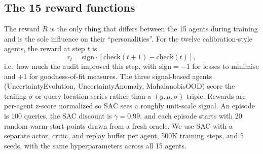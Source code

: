 \documentclass[11pt]{article}
\begin{document}
\subsection{The 15 reward functions}

The reward $R$ is the only thing that differs between the 15 agents during training and is the sole influence on their ``personalities''. For the twelve calibration-style agents, the reward at step $t$ is
\[
r_t = \text{sign} \cdot [\text{check}(t+1) - \text{check}(t)],
\]
i.e.\ how much the audit improved this step, with $\text{sign} = -1$ for losses to minimise and $+1$ for goodness-of-fit measures. The three signal-based agents (UncertaintyEvolution, UncertaintyAnomaly, MahalanobisOOD) score the trailing $\sigma$ or query-location series rather than a $(y, \mu, \sigma)$ triple. Rewards are per-agent z-score normalized so SAC sees a roughly unit-scale signal. An episode is 100 queries, the SAC discount is $\gamma = 0.99$, and each episode starts with 20 random warm-start points drawn from a fresh oracle. We use SAC with a separate actor, critic, and replay buffer per agent, 500K training steps, and 5 seeds, with the same hyperparameters across all 15 agents.
\end{document}

